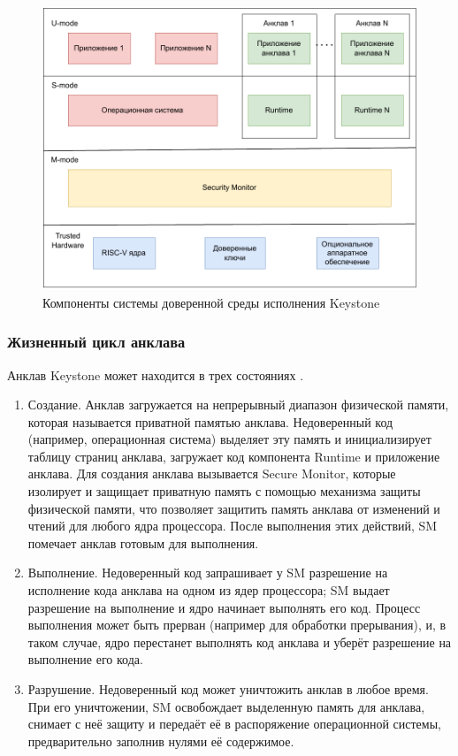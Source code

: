 \begin{figure}[h]
	\centering
	\includegraphics[width=\textwidth]{img/riscv-enclave-arch.pdf}
	\caption{Компоненты системы доверенной среды исполнения Keystone}
	\label{fig:riscv-enclave-arch}
\end{figure}

\subsubsection{Жизненный цикл анклава}

Анклав Keystone может находится в трех состояниях \cite{keystone-overview}.

\begin{enumerate}
	\item Создание. Анклав загружается на непрерывный диапазон физической памяти, которая называется приватной памятью анклава. Недоверенный код (например, операционная система) выделяет эту память и инициализирует таблицу страниц анклава, загружает код компонента Runtime и приложение анклава. Для создания анклава вызывается Secure Monitor, которые изолирует и защищает приватную память с помощью механизма защиты физической памяти, что позволяет защитить память анклава от изменений и чтений для любого ядра процессора. После выполнения этих действий, SM помечает анклав  готовым для выполнения.
	\item Выполнение. Недоверенный код запрашивает у SM разрешение на исполнение кода анклава на одном из ядер процессора; SM выдает разрешение на выполнение и ядро начинает выполнять его код. Процесс выполнения может быть прерван (например для обработки прерывания), и, в таком случае, ядро перестанет выполнять код анклава и уберёт разрешение на выполнение его кода.
	\item Разрушение. Недоверенный код может уничтожить анклав в любое время. При его уничтожении, SM освобождает выделенную память для анклава, снимает с неё защиту и передаёт её в распоряжение операционной системы, предварительно заполнив нулями её содержимое.
\end{enumerate}


